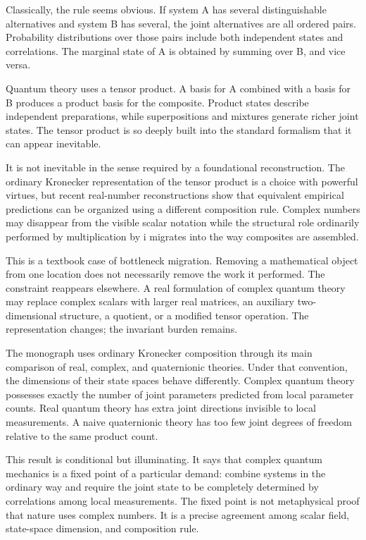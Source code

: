 \documentclass[12pt,openany]{book}
\begin{document}
Classically, the rule seems obvious. If system A has several distinguishable alternatives and system B has several, the joint alternatives are all ordered pairs. Probability distributions over those pairs include both independent states and correlations. The marginal state of A is obtained by summing over B, and vice versa.

Quantum theory uses a tensor product. A basis for A combined with a basis for B produces a product basis for the composite. Product states describe independent preparations, while superpositions and mixtures generate richer joint states. The tensor product is so deeply built into the standard formalism that it can appear inevitable.

It is not inevitable in the sense required by a foundational reconstruction. The ordinary Kronecker representation of the tensor product is a choice with powerful virtues, but recent real-number reconstructions show that equivalent empirical predictions can be organized using a different composition rule. Complex numbers may disappear from the visible scalar notation while the structural role ordinarily performed by multiplication by i migrates into the way composites are assembled.

This is a textbook case of bottleneck migration. Removing a mathematical object from one location does not necessarily remove the work it performed. The constraint reappears elsewhere. A real formulation of complex quantum theory may replace complex scalars with larger real matrices, an auxiliary two-dimensional structure, a quotient, or a modified tensor operation. The representation changes; the invariant burden remains.

The monograph uses ordinary Kronecker composition through its main comparison of real, complex, and quaternionic theories. Under that convention, the dimensions of their state spaces behave differently. Complex quantum theory possesses exactly the number of joint parameters predicted from local parameter counts. Real quantum theory has extra joint directions invisible to local measurements. A naive quaternionic theory has too few joint degrees of freedom relative to the same product count.

This result is conditional but illuminating. It says that complex quantum mechanics is a fixed point of a particular demand: combine systems in the ordinary way and require the joint state to be completely determined by correlations among local measurements. The fixed point is not metaphysical proof that nature uses complex numbers. It is a precise agreement among scalar field, state-space dimension, and composition rule.
\end{document}
